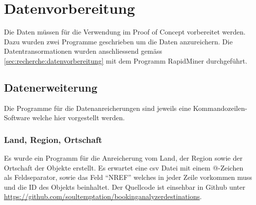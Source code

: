 

\section{Datenvorbereitung}
\label{sec:proofofconcept:datenvorbereitung}


Die Daten müssen für die Verwendung im Proof of Concept vorbereitet werden. Dazu wurden zwei Programme geschrieben um die Daten anzureichern. Die Datentransormationen wurden anschliessend gemäss \cref{sec:recherche:datenvorbereitung} mit dem Programm RapidMiner durchgeführt.

\subsection{Datenerweiterung}
\label{sec:proofofconcept:datenvorbereitung:datenerweiterung}
Die Programme für die Datenanreicherungen sind jeweils eine Kommandozeilen-Software welche hier vorgestellt werden.

\subsubsection{Land, Region, Ortschaft}
\label{sec:proofofconcept:datenvorbereitung:datenerweiterung:landregionortschaft}
Es wurde ein Programm für die Anreicherung vom Land, der Region sowie der Ortschaft der Objekte erstellt. Es erwartet eine \gls{csv} Datei mit einem @-Zeichen als Feldseparator, sowie das Feld "`NREF"' welches in jeder Zeile vorkommen muss und die ID des Objekts beinhaltet. Der Quellcode ist einsehbar in Github unter \url{https://github.com/soultemptation/bookinganalyzerdestinations}.

